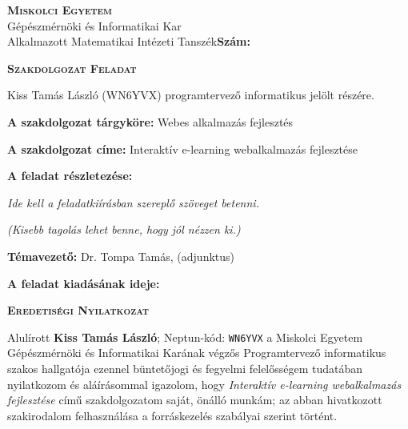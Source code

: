\noindent
\textsc{\textbf{Miskolci Egyetem}}\\
Gépészmérnöki és Informatikai Kar\\
Alkalmazott Matematikai Intézeti Tanszék\hspace*{4cm}\hfil \textbf{Szám:}

\vspace{0.5cm}
\begin{center}
\large\textsc{\textbf{Szakdolgozat Feladat}}
\end{center}
\vspace{0.5cm}

Kiss Tamás László (WN6YVX) programtervező informatikus jelölt részére.

\bigskip
\noindent\textbf{A szakdolgozat tárgyköre:} Webes alkalmazás fejlesztés

\bigskip
\noindent\textbf{A szakdolgozat címe:} Interaktív e-learning webalkalmazás fejlesztése

\bigskip
\noindent\textbf{A feladat részletezése:}

\medskip

\emph{Ide kell a feladatkiírásban szereplő szöveget betenni.}

\medskip

\emph{(Kisebb tagolás lehet benne, hogy jól nézzen ki.)}

\vfill

\noindent\textbf{Témavezető:} Dr. Tompa Tamás, (adjunktus)


\bigskip
\noindent\textbf{A feladat kiadásának ideje:}


\vspace{1.5cm}

\hfill\makebox[6cm]{\dotfill}

\hfill{}

\clearpage

\vspace*{1cm}  
\begin{center}
\large\textsc{\textbf{Eredetiségi Nyilatkozat}}
\end{center}
\vspace*{2cm}  

Alulírott \textbf{Kiss Tamás László}; Neptun-kód: \texttt{WN6YVX} a Miskolci Egyetem Gépészmérnöki és Informatikai Karának végzős Programtervező informatikus szakos hallgatója ezennel büntetőjogi és fegyelmi felelősségem tudatában nyilatkozom és aláírásommal igazolom, hogy \textit{Interaktív e-learning webalkalmazás fejlesztése}
című szakdolgozatom saját, önálló munkám; az abban hivatkozott szakirodalom
felhasználása a forráskezelés szabályai szerint történt.

